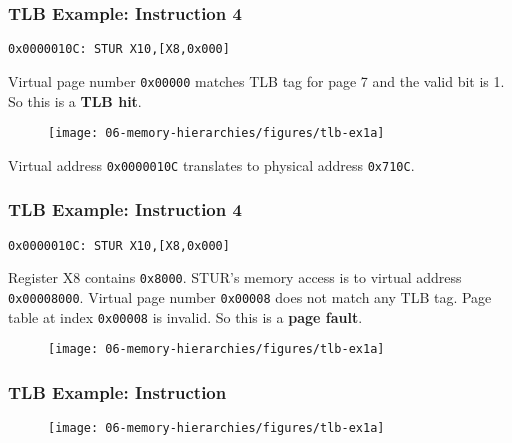{%
\begin{frame}[fragile]\frametitle{TLB Example: Instruction 4}
\begin{verbatim}
0x0000010C: STUR X10,[X8,0x000]
\end{verbatim}
Virtual page number \texttt{0x00000} matches TLB tag for page 7 and the valid bit is 1. So this is a \textbf{TLB hit}.
\begin{figure}[H]
\centering
	{\texttt{[image: 06-memory-hierarchies/figures/tlb-ex1a]}}
\end{figure}
Virtual address \texttt{0x0000010C} translates to physical address \texttt{0x710C}.
\end{frame}
\begin{frame}[fragile]\frametitle{TLB Example: Instruction 4}
\begin{verbatim}
0x0000010C: STUR X10,[X8,0x000]
\end{verbatim}
Register X8 contains \texttt{0x8000}. STUR's memory access is to virtual address \texttt{0x00008000}. Virtual page number \texttt{0x00008} does not match any TLB tag. Page table at index \texttt{0x00008} is invalid. So this is a \textbf{page fault}.
\begin{figure}[H]
\centering
	{\texttt{[image: 06-memory-hierarchies/figures/tlb-ex1a]}}
\end{figure}

\end{frame}

\begin{frame}[fragile]\frametitle{TLB Example: Instruction }
\begin{figure}[H]
\centering
	{\texttt{[image: 06-memory-hierarchies/figures/tlb-ex1a]}}
\end{figure}
\end{frame}


}

